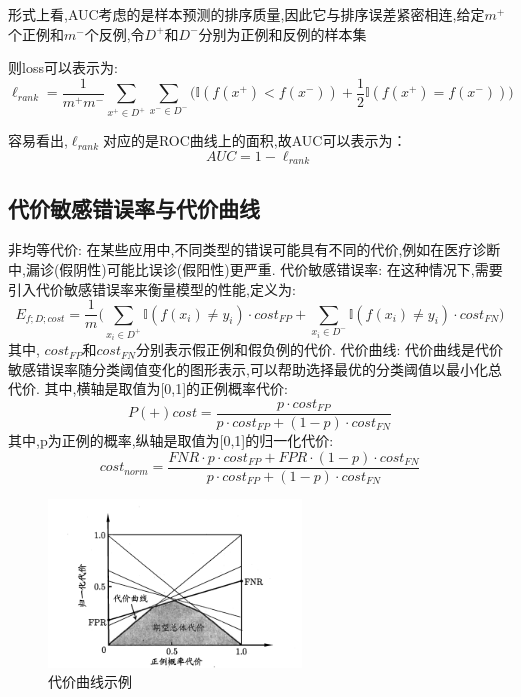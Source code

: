 形式上看,AUC考虑的是样本预测的排序质量,因此它与排序误差紧密相连,给定$m^+$个正例和$m^-$个反例,令$D^+$和$D^-$分别为正例和反例的样本集

则loss可以表示为:
\begin{equation}
    \ell_{rank} = \frac{1}{m^+ m^-} \sum_{x^+ \in D^+} \sum_{x^- \in D^-}\big( \mathbb{I}(f(x^+) <f(x^-))+\frac{1}{2}\mathbb{I}(f(x^+) = f(x^-))\big)
\end{equation}

容易看出,$\ell_{rank}$对应的是ROC曲线上的面积,故AUC可以表示为：
\begin{equation}
    AUC = 1 - \ell_{rank}
\end{equation}
\subsection{代价敏感错误率与代价曲线}
非均等代价: 在某些应用中,不同类型的错误可能具有不同的代价,例如在医疗诊断中,漏诊(假阴性)可能比误诊(假阳性)更严重.
代价敏感错误率: 在这种情况下,需要引入代价敏感错误率来衡量模型的性能,定义为:
\begin{equation}
    E_{f;D;cost} = \frac{1}{m} \big(\sum_{x_i \in D^+} \mathbb{I}(f(x_i) \neq y_i) \cdot cost_{FP} + \sum_{x_i \in D^-} \mathbb{I}(f(x_i) \neq y_i) \cdot cost_{FN}\big)
\end{equation}
其中, $cost_{FP}$和$cost_{FN}$分别表示假正例和假负例的代价.
代价曲线: 代价曲线是代价敏感错误率随分类阈值变化的图形表示,可以帮助选择最优的分类阈值以最小化总代价.
其中,横轴是取值为[0,1]的正例概率代价:
\begin{equation}
    P(+)cost=\frac{p \cdot cost_{FP}}{p \cdot cost_{FP} + (1-p) \cdot cost_{FN}}
\end{equation}
其中,p为正例的概率,纵轴是取值为[0,1]的归一化代价:
\begin{equation}
    cost_{norm}=\frac{FNR \cdot p \cdot cost_{FP} + FPR \cdot (1-p) \cdot cost_{FN}}{p \cdot cost_{FP} + (1-p) \cdot cost_{FN}}
\end{equation}
\begin{figure}[H]
    \centering
    \includegraphics[width=0.6\textwidth]{static/images/代价曲线与期望总体代价.png}
    \caption{代价曲线示例}
    \label{fig:cost_curve}
\end{figure}
